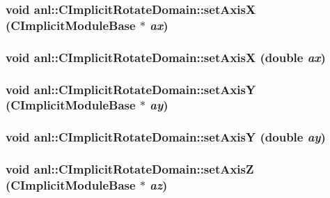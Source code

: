 \label{classanl_1_1CImplicitRotateDomain_ae30695e1ea7d8b089bb446c175f57e4f}
\hypertarget{classanl_1_1CImplicitRotateDomain_a1ceef542b5dce3e249ca4a153b74a742}{
\subsubsection[{setAxisX}]{\setlength{\rightskip}{0pt plus 5cm}void anl::CImplicitRotateDomain::setAxisX ({\bf CImplicitModuleBase} $\ast$ {\em ax})}}
\label{classanl_1_1CImplicitRotateDomain_a1ceef542b5dce3e249ca4a153b74a742}
\hypertarget{classanl_1_1CImplicitRotateDomain_aab99f48401bf6544843f22ffbde25d96}{
\subsubsection[{setAxisX}]{\setlength{\rightskip}{0pt plus 5cm}void anl::CImplicitRotateDomain::setAxisX (double {\em ax})}}
\label{classanl_1_1CImplicitRotateDomain_aab99f48401bf6544843f22ffbde25d96}
\hypertarget{classanl_1_1CImplicitRotateDomain_a5c9d2605bad361140c5f84e6e51cf0e9}{
\subsubsection[{setAxisY}]{\setlength{\rightskip}{0pt plus 5cm}void anl::CImplicitRotateDomain::setAxisY ({\bf CImplicitModuleBase} $\ast$ {\em ay})}}
\label{classanl_1_1CImplicitRotateDomain_a5c9d2605bad361140c5f84e6e51cf0e9}
\hypertarget{classanl_1_1CImplicitRotateDomain_a45fd5e71bdd3506a578426af5733e3a8}{
\subsubsection[{setAxisY}]{\setlength{\rightskip}{0pt plus 5cm}void anl::CImplicitRotateDomain::setAxisY (double {\em ay})}}
\label{classanl_1_1CImplicitRotateDomain_a45fd5e71bdd3506a578426af5733e3a8}
\hypertarget{classanl_1_1CImplicitRotateDomain_ab092ff91ebd67fa749000e36b2412f98}{
\subsubsection[{setAxisZ}]{\setlength{\rightskip}{0pt plus 5cm}void anl::CImplicitRotateDomain::setAxisZ ({\bf CImplicitModuleBase} $\ast$ {\em az})}}
